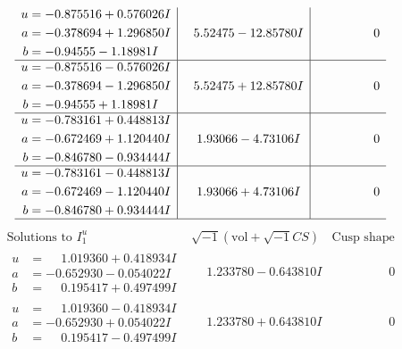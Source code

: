 \documentclass[1p]{elsarticle_modified}
\theoremstyle{definition}
\newcommand{\I}{\sqrt{-1}}
\begin{document}
$$\begin{array}{c|c|c}
\begin{aligned}
u &= -0.875516 + 0.576026 I \\
a &= -0.378694 + 1.296850 I \\
b &= -0.94555 - 1.18981 I\end{aligned}
 & \phantom{-}5.52475 - 12.85780 I & \phantom{-0.000000 } 0 \\ \hline\begin{aligned}
u &= -0.875516 - 0.576026 I \\
a &= -0.378694 - 1.296850 I \\
b &= -0.94555 + 1.18981 I\end{aligned}
 & \phantom{-}5.52475 + 12.85780 I & \phantom{-0.000000 } 0 \\ \hline\begin{aligned}
u &= -0.783161 + 0.448813 I \\
a &= -0.672469 + 1.120440 I \\
b &= -0.846780 - 0.934444 I\end{aligned}
 & \phantom{-}1.93066 - 4.73106 I & \phantom{-0.000000 } 0 \\ \hline\begin{aligned}
u &= -0.783161 - 0.448813 I \\
a &= -0.672469 - 1.120440 I \\
b &= -0.846780 + 0.934444 I\end{aligned}
 & \phantom{-}1.93066 + 4.73106 I & \phantom{-0.000000 } 0\\
 \hline 
 \end{array}$$\newpage$$\begin{array}{c|c|c}  
\text{Solutions to }I^u_{1}& \I (\text{vol} + \sqrt{-1}CS) & \text{Cusp shape}\\
 \hline 
\begin{aligned}
u &= \phantom{-}1.019360 + 0.418934 I \\
a &= -0.652930 - 0.054022 I \\
b &= \phantom{-}0.195417 + 0.497499 I\end{aligned}
 & \phantom{-}1.233780 - 0.643810 I & \phantom{-0.000000 } 0 \\ \hline\begin{aligned}
u &= \phantom{-}1.019360 - 0.418934 I \\
a &= -0.652930 + 0.054022 I \\
b &= \phantom{-}0.195417 - 0.497499 I\end{aligned}
 & \phantom{-}1.233780 + 0.643810 I & \phantom{-0.000000 } 0 \\ \hline\begin{aligned}

\end{aligned}
\end{array}$$
\end{document}
